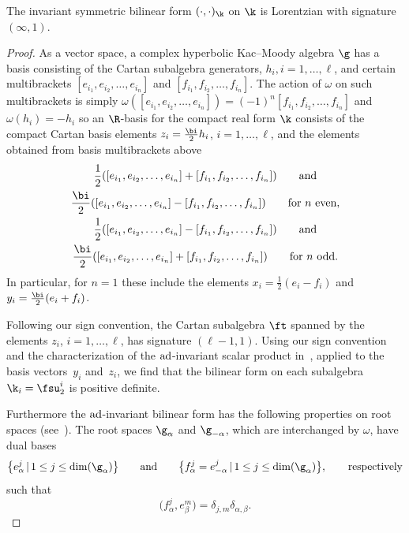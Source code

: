 \begin{Lemma}
The invariant symmetric bilinear form $(\cdot,\cdot)_{\k}$ on $\k$ is Lorentzian with signature $(\infty,1)$.
\end{Lemma}

\begin{proof} As a vector space, a complex hyperbolic Kac--Moody algebra $\g$ has a basis consisting of the Cartan subalgebra
generators, $h_i, i=1,\dots, \ell$, and certain multibrackets $[e_{i_1},e_{i_2},\dots,e_{i_n}]$ and $[f_{i_1},f_{i_2},\dots,f_{i_n}]$.
The action of $\omega$ on such multibrackets is simply $\omega([e_{i_1},e_{i_2},\dots,e_{i_n}]) = (-1)^n [f_{i_1},f_{i_2},\dots,f_{i_n}]$
and $\omega(h_i) = -h_i$ so an $\R$-basis for the compact real form $\k$ consists of the compact Cartan basis elements
$z_i =\frac{\bi}{2}h_i$, $i=1,\dots, \ell$, and the elements obtained from basis multibrackets above
\begin{gather*}
\frac{1}{2} ([e_{i_1},e_{i_2},\dots,e_{i_n}] + [f_{i_1},f_{i_2},\dots,f_{i_n}] ) \qquad \text{and}\\
 \frac{\bi}{2} ([e_{i_1},e_{i_2},\dots,e_{i_n}] - [f_{i_1},f_{i_2},\dots,f_{i_n}] )\qquad \text{for $n$ even},\\
\frac{1}{2} ([e_{i_1},e_{i_2},\dots,e_{i_n}] - [f_{i_1},f_{i_2},\dots,f_{i_n}] ) \qquad \text{and}\\
 \frac{\bi}{2} ([e_{i_1},e_{i_2},\dots,e_{i_n}] + [f_{i_1},f_{i_2},\dots,f_{i_n}] )\qquad \text{for $n$ odd}.
\end{gather*}
In particular, for $n = 1$ these include the elements $x_i=\frac{1}{2}(e_i-f_i)$ and
$y_i=\frac{\bi}{2}(e_i+f_i)$.

Following our sign convention, the Cartan subalgebra $\ft$ spanned by the elements $z_i$, $i=1,\dots, \ell$, has signature $(\ell-1,1)$. Using our sign convention and the characterization of the ${\rm ad}$-invariant scalar product in~\cite[equation~(2.2.1)]{Kac90}, applied to the basis vectors~$y_i$ and~$z_i$, we find that the bilinear form on each subalgebra $\k_i=\fsu_2^i$ is positive definite.

Furthermore the ${\rm ad}$-invariant bilinear form has the following properties on root spaces (see~\cite[Sections~2.1 and~2.2]{Kac90}). The root spaces $\g_{\alpha}$ and $\g_{-\alpha}$, which are interchanged by $\omega$, have dual bases
 \[\big\{e_{\alpha}^{j}\, |\, 1\leq j\leq \dim (\g_{\alpha})\big\} \qquad \text{and} \qquad
 \big\{f_{\alpha}^{j} = e_{-\alpha}^{j}\, |\, 1\leq j\leq \dim (\g_{\alpha}) \big\}, \qquad \text{respectively}\]
 such that
\[\big( f_{\alpha}^j, e_{\beta}^m\big) =\delta_{j,m}\delta_{\alpha, \beta} .\]


\end{proof}
